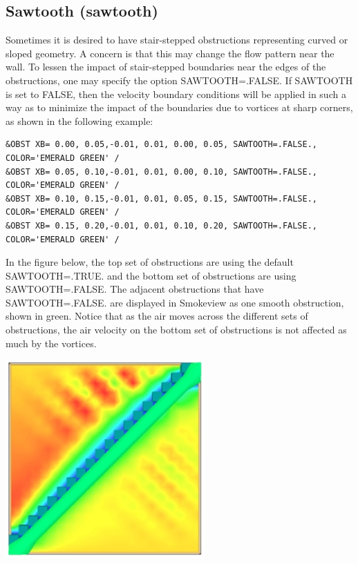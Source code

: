 \documentclass[11pt]{book}
\begin{document}
\clearpage



\subsection{Sawtooth ({\bf sawtooth})  }

Sometimes it is desired to have stair-stepped obstructions representing curved or sloped geometry. A concern is that this may change the flow pattern near the wall. To lessen the impact of stair-stepped boundaries near the edges of the obstructions, one may specify the option {\ct SAWTOOTH=.FALSE.} If {\ct SAWTOOTH} is set to {\ct FALSE}, then the velocity boundary conditions will be applied in such a way as to minimize the impact of the boundaries due to vortices at sharp corners, as shown in the following example:

\scriptsize
\begin{verbatim}
&OBST XB= 0.00, 0.05,-0.01, 0.01, 0.00, 0.05, SAWTOOTH=.FALSE., COLOR='EMERALD GREEN' /
&OBST XB= 0.05, 0.10,-0.01, 0.01, 0.00, 0.10, SAWTOOTH=.FALSE., COLOR='EMERALD GREEN' /
&OBST XB= 0.10, 0.15,-0.01, 0.01, 0.05, 0.15, SAWTOOTH=.FALSE., COLOR='EMERALD GREEN' /
&OBST XB= 0.15, 0.20,-0.01, 0.01, 0.10, 0.20, SAWTOOTH=.FALSE., COLOR='EMERALD GREEN' /
\end{verbatim}\normalsize

In the figure below, the top set of obstructions are using the default {\ct SAWTOOTH=.TRUE.} and the bottom set of obstructions are using {\ct SAWTOOTH=.FALSE.} The adjacent obstructions that have {\ct SAWTOOTH=.FALSE.} are displayed in Smokeview as one smooth obstruction, shown in green. Notice that as the air moves across the different sets of obstructions, the air velocity on the bottom set of obstructions is not affected as much by the vortices.

\begin{center}
\includegraphics[width=3in]{FIGURES/sawtooth.jpg}
\end{center}
\end{document}
